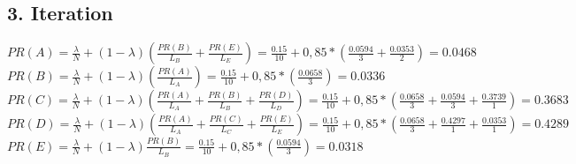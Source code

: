 \subsection*{3. Iteration}
 $PR(A) = \frac{\lambda}{N} + (1-\lambda)  (\frac{PR(B)}{L_{B}} + \frac{PR(E)}{L_{E}}) = \frac{0.15}{10} + 0,85 * (\frac{0.0594}{3} + \frac{0.0353}{2}) = 0.0468$ 
\\
$PR(B) = \frac{\lambda}{N} + (1-\lambda)  (\frac{PR(A)}{L_{A}}) = \frac{0.15}{10} + 0,85 * (\frac{0.0658}{3}) = 0.0336$
\\
$PR(C) = \frac{\lambda}{N} + (1-\lambda)  (\frac{PR(A)}{L_{A}} + \frac{PR(B)}{L_{B}} + \frac{PR(D)}{L_{D}}) = \frac{0.15}{10} + 0,85 * (\frac{0.0658}{3} + \frac{0.0594}{3} + \frac{0.3739}{1}) = 0.3683$ 
\\ 
$PR(D) = \frac{\lambda}{N} + (1-\lambda)  (\frac{PR(A)}{L_{A}} + \frac{PR(C)}{L_{C}} + \frac{PR(E)}{L_{E}}) = \frac{0.15}{10} + 0,85 * (\frac{0.0658}{3} + \frac{0.4297}{1} + \frac{0.0353}{1}) = 0.4289$ 
\\
$PR(E) = \frac{\lambda}{N} + (1-\lambda)  \frac{PR(B)}{L_{B}} = \frac{0.15}{10} + 0,85 * (\frac{0.0594}{3}) = 0.0318$